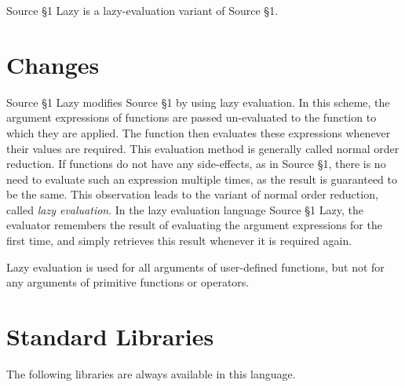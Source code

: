 





Source \S 1 Lazy is a lazy-evaluation variant of Source \S 1.

\section{Changes}

Source \S 1 Lazy modifies Source \S 1 by using
lazy evaluation. In
this scheme, the argument expressions of functions are passed un-evaluated
to the function to which they are applied. The function then evaluates
these expressions whenever their values are required. This evaluation method
is generally called normal order reduction. If functions
do not have any side-effects, as in Source \S 1,
there is no need to evaluate such an expression
multiple times, as the result is guaranteed to be the same. This observation
leads to the variant of normal order reduction, called \emph{lazy evaluation}.
In the lazy evaluation language Source \S 1 Lazy,
the evaluator remembers the result of evaluating the
argument expressions for the first time, and simply retrieves this result
whenever it is required again.

Lazy evaluation is used for all arguments of user-defined functions, but
not for any arguments of primitive functions or operators.





\newpage

















\section{Standard Libraries}

The following libraries are always available in this language.








    
